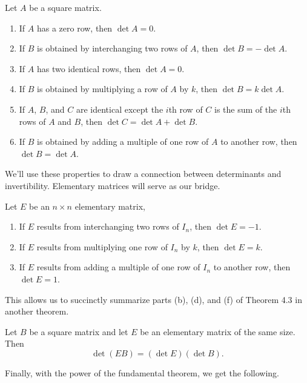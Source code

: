 \documentclass[../m073main.tex]{subfiles}
\begin{document}
\begin{theorem}
	Let $A$ be a square matrix.
	\begin{enumerate}[label=(\alph*)]
		\item If $A$ has a zero row, then $\det A = 0$.
		\item If $B$ is obtained by interchanging two rows of $A$, then $\det B = -\det A$.
		\item If $A$ has two identical rows, then $\det A = 0$.
		\item If $B$ is obtained by multiplying a row of $A$ by $k$, then $\det B = k \det A$.
		\item If $A$, $B$, and $C$ are identical except the $i$th row of $C$ is the sum of the $i$th rows of $A$ and $B$, then $\det C = \det A + \det B$.
		\item If $B$ is obtained by adding a multiple of one row of $A$ to another row, then $\det B = \det A$.
	\end{enumerate}
\end{theorem}

We'll use these properties to draw a connection between determinants and invertibility.
Elementary matrices will serve as our bridge.

\begin{theorem}
	Let $E$ be an $n \times n$ elementary matrix,
	\begin{enumerate}[label=(\alph*)]
		\item If $E$ results from interchanging two rows of $I_n$, then $\det E = -1$.
		\item If $E$ results from multiplying one row of $I_n$ by $k$, then $\det E = k$.
		\item If $E$ results from adding a multiple of one row of $I_n$ to another row, then $\det E = 1$.
	\end{enumerate}
\end{theorem}

This allows us to succinctly summarize parts (b), (d), and (f) of Theorem 4.3 in another theorem.

\begin{lemma}
	Let $B$ be a square matrix and let $E$ be an elementary matrix of the same size.
	Then
	\[ \det (EB) = (\det E)(\det B). \]
\end{lemma}

Finally, with the power of the fundamental theorem, we get the following.
\end{document}
